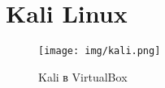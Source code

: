 \section{Kali Linux}

\begin{figure}[H]
	\centering
	\texttt{[image: img/kali.png]}
	\caption{Kali в VirtualBox}
\end{figure}
